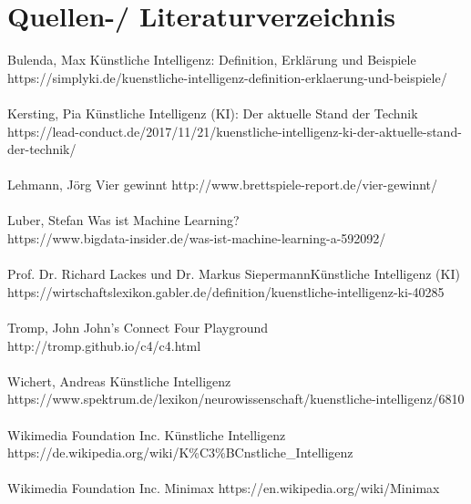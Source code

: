\documentclass[12pt,a4paper]{article}
\begin{document}
	\section{Quellen-/ Literaturverzeichnis}
	Bulenda, Max \glqq Künstliche Intelligenz: Definition, Erklärung und Beispiele\grqq{}\\ https://simplyki.de/kuenstliche-intelligenz-definition-erklaerung-und-beispiele/\\\\
	Kersting, Pia \glqq Künstliche Intelligenz (KI): Der aktuelle Stand der Technik\grqq{}\\ https://lead-conduct.de/2017/11/21/kuenstliche-intelligenz-ki-der-aktuelle-stand-der-technik/\\\\
	Lehmann, Jörg \glqq Vier gewinnt\grqq{} http://www.brettspiele-report.de/vier-gewinnt/\\\\
	Luber, Stefan \glqq Was ist Machine Learning?\grqq{} \\https://www.bigdata-insider.de/was-ist-machine-learning-a-592092/\\\\
	Prof. Dr. Richard Lackes und Dr. Markus Siepermann\glqq Künstliche Intelligenz (KI)\grqq{}\\ https://wirtschaftslexikon.gabler.de/definition/kuenstliche-intelligenz-ki-40285\\\\
	Tromp, John  \glqq John's Connect Four Playground \grqq{}\\ http://tromp.github.io/c4/c4.html\\\\
	Wichert, Andreas \glqq Künstliche Intelligenz\grqq{}\\ https://www.spektrum.de/lexikon/neurowissenschaft/kuenstliche-intelligenz/6810\\\\
	Wikimedia Foundation Inc. \glqq Künstliche Intelligenz\grqq{}\\ https://de.wikipedia.org/wiki/K\%C3\%BCnstliche\_Intelligenz\\\\
	Wikimedia Foundation Inc. \glqq Minimax\grqq{} https://en.wikipedia.org/wiki/Minimax\\
\end{document}
